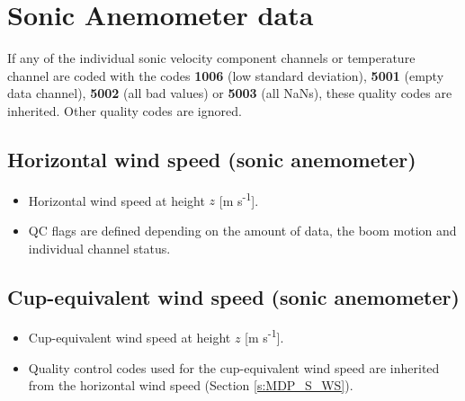 \section{Sonic Anemometer data}
If any of the individual sonic velocity component channels or temperature channel are coded with the codes \textbf{1006} (low standard deviation), \textbf{5001} (empty data channel), \textbf{5002} (all bad values) or \textbf{5003} (all NaNs), these quality codes are inherited. Other quality codes are ignored.

\subsection{Horizontal wind speed (sonic anemometer)\label{s:MDP_S_WS}} 
\begin{itemize}
\item {} Horizontal wind speed at height $z$ [m s\textsuperscript{-1}].
\item {} QC flags are defined depending on the amount of data, the boom motion and individual channel status.
\end{itemize}

\subsection{Cup-equivalent wind speed (sonic anemometer)}
\begin{itemize}
\item {} Cup-equivalent wind speed at height $z$ [m s\textsuperscript{-1}].
\item {} Quality control codes used for the cup-equivalent wind speed are inherited from the horizontal wind speed (Section \ref{s:MDP_S_WS}).
\end{itemize}

